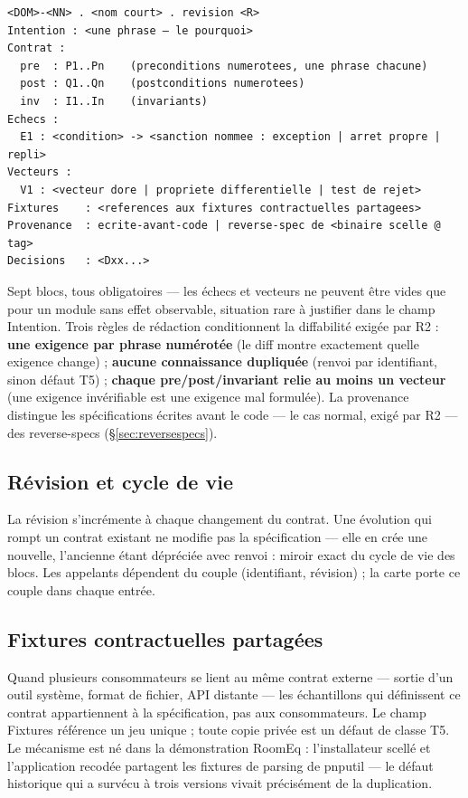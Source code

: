 \begin{lstlisting}
<DOM>-<NN> . <nom court> . revision <R>
Intention : <une phrase — le pourquoi>
Contrat :
  pre  : P1..Pn    (preconditions numerotees, une phrase chacune)
  post : Q1..Qn    (postconditions numerotees)
  inv  : I1..In    (invariants)
Echecs :
  E1 : <condition> -> <sanction nommee : exception | arret propre | repli>
Vecteurs :
  V1 : <vecteur dore | propriete differentielle | test de rejet>
Fixtures    : <references aux fixtures contractuelles partagees>
Provenance  : ecrite-avant-code | reverse-spec de <binaire scelle @ tag>
Decisions   : <Dxx...>
\end{lstlisting}

Sept blocs, tous obligatoires — les échecs et vecteurs ne peuvent être vides que pour un
module sans effet observable, situation rare à justifier dans le champ Intention. Trois
règles de rédaction conditionnent la diffabilité exigée par R2 : \textbf{une exigence par
phrase numérotée} (le diff montre exactement quelle exigence change) ; \textbf{aucune
connaissance dupliquée} (renvoi par identifiant, sinon défaut T5) ; \textbf{chaque
pre/post/invariant relie au moins un vecteur} (une exigence invérifiable est une exigence
mal formulée). La provenance distingue les spécifications écrites avant le code — le cas
normal, exigé par R2 — des reverse-specs (§\ref{sec:reversespecs}).

\subsection{Révision et cycle de vie}

La révision s’incrémente à chaque changement du contrat. Une évolution qui rompt un
contrat existant ne modifie pas la spécification — elle en crée une nouvelle, l’ancienne
étant dépréciée avec renvoi : miroir exact du cycle de vie des blocs. Les appelants
dépendent du couple (identifiant, révision) ; la carte porte ce couple dans chaque entrée.

\subsection{Fixtures contractuelles partagées}

Quand plusieurs consommateurs se lient au même contrat externe — sortie d’un outil
système, format de fichier, API distante — les échantillons qui définissent ce contrat
appartiennent à la spécification, pas aux consommateurs. Le champ Fixtures référence un
jeu unique ; toute copie privée est un défaut de classe T5. Le mécanisme est né dans la
démonstration RoomEq : l’installateur scellé et l’application recodée partagent les
fixtures de parsing de pnputil — le défaut historique qui a survécu à trois versions
vivait précisément de la duplication.

